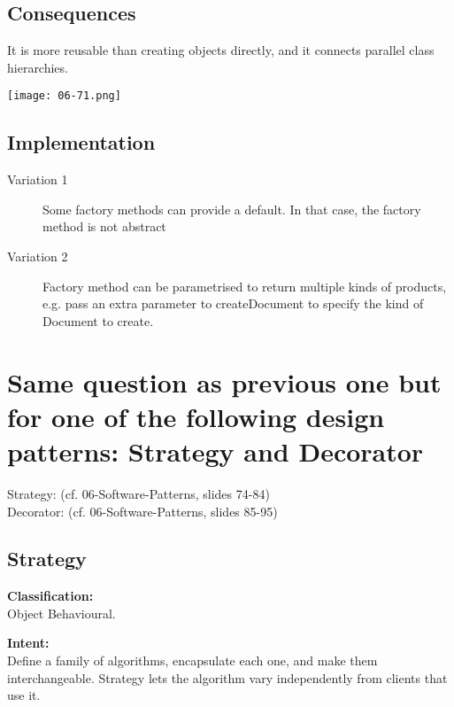\subsection{Consequences}

It is more reusable than creating objects directly, and it connects parallel class hierarchies.

\begin{center}
\texttt{[image: 06-71.png]}
\end{center}

\subsection{Implementation}

\begin{description}
\item[Variation 1]

	Some factory methods can provide a default. In that case, the factory method is not abstract

\item[Variation 2]
	
	Factory method can be parametrised to return multiple kinds of products, e.g. pass an extra parameter to createDocument to specify the kind of Document to create.
\end{description}


\section{Same question as previous one but for one of the following design patterns:
Strategy and Decorator}

Strategy: (cf. 06-Software-Patterns, slides 74-84)
\\
Decorator: (cf. 06-Software-Patterns, slides 85-95)

\subsection{Strategy}

\vspace{12pt}\textbf{Classification:}\\
Object Behavioural.

\vspace{12pt}\textbf{Intent:}\\
Define a family of algorithms, encapsulate each one, and make them interchangeable. Strategy lets the algorithm vary independently from clients that use it.

